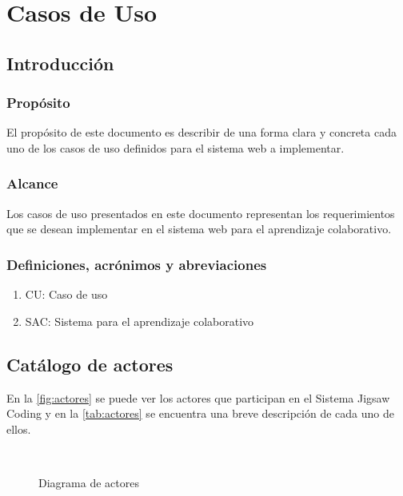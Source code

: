 \chapter{Casos de Uso}\label{apendice.A}
\section{Introducción}
\subsection{Propósito}
El propósito de este documento es describir de una forma clara y concreta cada uno de los casos de uso definidos para el sistema web a implementar.
\subsection{Alcance}
Los casos de uso presentados en este documento representan los requerimientos que se desean implementar en el sistema web para el aprendizaje colaborativo.
\subsection{Definiciones, acrónimos y abreviaciones}
\begin{enumerate}
  \item CU: Caso de uso
  \item SAC: Sistema para el aprendizaje colaborativo
\end{enumerate}
\clearpage
\section{Catálogo de actores}
En la  \autoref{fig:actores} se puede ver los actores que participan en el Sistema Jigsaw Coding y en la \autoref{tab:actores} se encuentra una breve descripción de cada uno de ellos.
\begin{figure}
  \centering
  \\
  \caption[Diagrama de actores]{Diagrama de actores}
  \label{fig:actores}
\end{figure}

